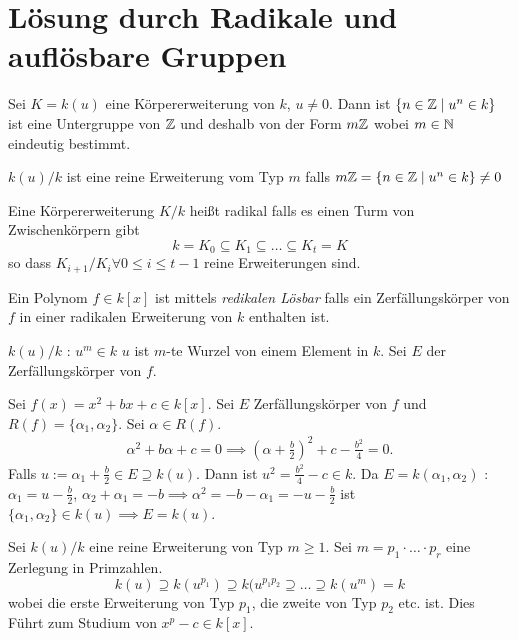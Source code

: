 \graphicspath{{Images/}}

\chapter{Lösung durch Radikale und auflösbare Gruppen}

Sei $K = k(u)$ eine Körpererweiterung von $k$, $u \neq 0$.
Dann ist $\{n \in \mathbb{Z} \mid u^{n} \in k\}$ ist eine Untergruppe von $\mathbb{Z}$ und deshalb von der Form $m \mathbb{Z}$ wobei $m \in \mathbb{N}$
eindeutig bestimmt.

\begin{definition}
	$k(u) / k$ ist eine reine Erweiterung vom Typ $m$ falls $m \mathbb{Z} = \{n \in \mathbb{Z} \mid u^{n} \in k\} \neq 0$
\end{definition}

\begin{definition}
	Eine Körpererweiterung $K / k$ heißt radikal falls es einen Turm von Zwischenkörpern gibt
	\[
	k = K_0 \subseteq K_1 \subseteq \ldots \subseteq K_{t} = K
	\] 
	so dass $K_{i+1} / K_{i} \forall 0 \leq i \leq t-1$ reine Erweiterungen sind.
\end{definition}

\begin{definition}
	Ein Polynom $f \in k[x]$ ist mittels \emph{redikalen Lösbar} falls ein Zerfällungskörper von $f$ in einer radikalen Erweiterung
	von $k$ enthalten ist.
\end{definition}

$k(u) / k$ : $u^{m} \in k$ $u$ ist $m$-te Wurzel von einem Element in $k$.
Sei $E$ der Zerfällungskörper von $f$.

\begin{eg}
	Sei $f(x) = x^2 + b x + c \in k[x]$. Sei $E$ Zerfällungskörper von $f$ und $R(f) = \{\alpha_1,\alpha_2\}$. Sei $\alpha \in R(f)$.
	\begin{align*}
		\alpha^2 + b \alpha + c = 0 \implies (\alpha + \frac{b}{2})^2 + c - \frac{b^2}{4} = 0
	.\end{align*}
	Falls $u := \alpha_1 +\frac{b}{2} \in E \supseteq k(u)$. Dann ist $u^2 = \frac{b^2}{4}-c \in k$.
	Da $E = k(\alpha_1,\alpha_2)$ : $\alpha_1 = u-\frac{b}{2}$, $\alpha_2 + \alpha_1 = -b \implies \alpha^2 = -b -\alpha_1 = -u -\frac{b}{2}$ 
	ist  $\{\alpha_1,\alpha_2\} \in k(u) \implies E = k(u)$.
\end{eg}

Sei $k(u) / k$ eine reine Erweiterung von Typ $m \geq 1$.
Sei $m = p_1 \cdot \ldots \cdot p_{r}$ eine Zerlegung in Primzahlen.
\[
	k(u) \supseteq k(u^{p_1}) \supseteq k(u^{p_1 p_2} \supseteq \ldots \supseteq k(u^{m}) = k
\] 
wobei die erste Erweiterung von Typ $p_1$, die zweite von Typ $p_2$ etc. ist.
Dies Führt zum Studium von $x^{p} - c \in k[x]$.

